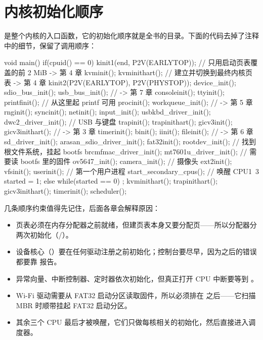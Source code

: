 \section{内核初始化顺序}
\label{sec:init-order}

 是整个内核的入口函数，它的初始化顺序就是全书的目录。下面的代码去掉了注释中的细节，保留了调用顺序：

\begin{ccode}
void main() {
  if(cpuid() == 0){
    kinit1(end, P2V(EARLYTOP));  // 只用启动页表覆盖的前 2 MiB    -> 第 4 章
    kvminit();  kvminithart();   // 建立并切换到最终内核页表      -> 第 4 章
    kinit2(P2V(EARLYTOP), P2V(PHYSTOP));
    device_init(); sdio_bus_init(); usb_bus_init();             // -> 第 7 章
    consoleinit(); ttyinit(); printfinit();                     // 从这里起 printf 可用
    procinit(); workqueue_init();                               // -> 第 5 章
    rnginit(); syncinit(); netinit();
    input_init(); usbkbd_driver_init(); dwc2_driver_init();     // USB 与键盘
    trapinit(); trapinithart(); gicv3init(); gicv3inithart();   // -> 第 3 章
    timerinit();
    binit(); iinit(); fileinit();                               // -> 第 6 章
    sd_driver_init(); arasan_sdio_driver_init();
    fat32init(); rootdev_init();                                // 找到根文件系统，挂起 bootfs
    brcmfmac_driver_init(); mt7601u_driver_init();              // 需要读 bootfs 里的固件
    ov5647_init(); camera_init();                               // 摄像头
    ext2init(); vfsinit();
    userinit();                                                 // 第一个用户进程
    start_secondary_cpus();                                     // 唤醒 CPU1~3
    started = 1;
  } else {
    while(started == 0) ;
    kvminithart(); trapinithart(); gicv3inithart(); timerinit();
  }
  scheduler();
}
\end{ccode}

几条顺序约束值得先记住，后面各章会解释原因：

\begin{itemize}
  \item 页表必须在内存分配器之前就绪，但建页表本身又要分配页——所以分配器分两次初始化（/）。
  \item 设备核心（）要在任何驱动注册之前初始化；控制台要尽早，因为之后的错误都要靠  报告。
  \item 异常向量、中断控制器、定时器依次初始化，但真正打开 CPU 中断要等到 。
  \item Wi-Fi 驱动需要从 FAT32 启动分区读取固件，所以必须排在  之后——它扫描 MBR 时顺带挂起 FAT32 启动分区。
  \item 其余三个 CPU 最后才被唤醒，它们只做每核相关的初始化，然后直接进入调度器。
\end{itemize}
